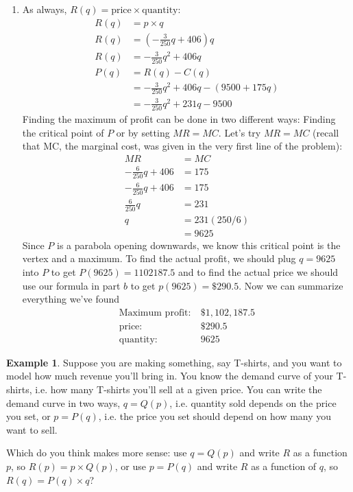 \documentclass[oneside]{book}
\theoremstyle{definition}
\newtheorem{example}{Example}
\theoremstyle{solution}
\newtheorem*{solution}{Solution}
\newenvironment{solution}{\vspace{2in}\comment}{\endcomment}
\begin{document}
\begin{solution}
\begin{enumerate}
\item As always, $R(q) = \text{price}\times \text{quantity}$:
  \begin{align*}
    R(q) & = p\times q\\
    R(q) & = \left(-\frac{3}{250}q + 406\right)q\\
    R(q) & = -\frac{3}{250}q^2 + 406 q\\
    P(q) & = R(q) - C(q)\\
         & = -\frac{3}{250}q^2 + 406q - (9500+175q)\\
         & = -\frac{3}{250}q^2+231q - 9500
\end{align*}
Finding the maximum of profit can be done in two different ways:
Finding the critical point of $P$ or by setting $MR = MC$.  Let's try
$MR=MC$ (recall that MC, the marginal cost, was given in the very
first line of the problem):
\begin{align*}
  MR                    & = MC         \\
  -\frac{6}{250}q + 406 & = 175        \\
  -\frac{6}{250}q + 406 & = 175        \\
  \frac{6}{250}q        & = 231        \\
  q                     & = 231(250/6) \\
                        & = 9625
\end{align*}
Since $P$ is a parabola opening downwards, we know this critical point
is the vertex and a maximum.  To find the actual profit, we should
plug $q=9625$ into $P$ to get $P(9625) = 1102187.5$ and to find the
actual price we should use our formula in part $b$ to get
$p(9625) = \$290.5$.  Now we can summarize everything we've found
\begin{align*}
  \text{Maximum profit:} & \ \$1,102,187.5\\
  \text{price:} &\  \$290.5\\
  \text{quantity:} &\  9625
\end{align*}
\end{enumerate}
\end{solution}

\begin{example}
  Suppose you are making something, say T-shirts, and you want to
  model how much revenue you'll bring in.  You know the demand curve
  of your T-shirts, i.e. how many T-shirts you'll sell at a given
  price.  You can write the demand curve in two ways, $q=Q(p)$,
  i.e. quantity sold depends on the price you set, or $p=P(q)$,
  i.e. the price you set should depend on how many you want to sell.

  Which do you think makes more sense: use $q=Q(p)$ and write $R$ as a
  function $p$, so $R(p)= p\times Q(p)$, or use $p=P(q)$ and write $R$
  as a function of $q$, so $R(q) = P(q)\times q$?
\end{example}
\end{document}
